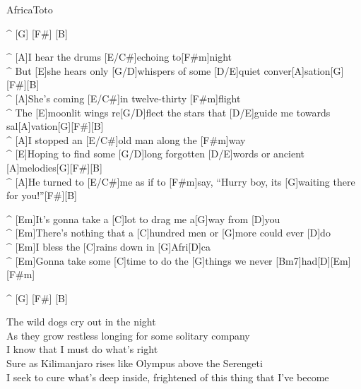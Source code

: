 \begin{song}{Africa}{Toto}

\begin{guitar}
^ [G] [F#] [B]\\
\end{guitar}

\begin{guitar}
^ [A]I hear the drums [E/C#]echoing to[F#m]night\\
^ But [E]she hears only [G/D]whispers of some [D/E]quiet conver[A]sation[G][F#][B]\\
^ [A]She's coming [E/C#]in twelve-thirty [F#m]flight\\
^ The [E]moonlit wings re[G/D]flect the stars that [D/E]guide me towards sal[A]vation[G][F#][B]\\
^ [A]I stopped an [E/C#]old man along the [F#m]way\\
^ [E]Hoping to find some [G/D]long forgotten [D/E]words or ancient [A]melodies[G][F#][B]\\
^ [A]He turned to [E/C#]me as if to [F#m]say, “Hurry boy, its [G]waiting there for you!”[F#][B]\\
\end{guitar}

\begin{guitar}
^ [Em]It's gonna take a [C]lot to drag me a[G]way from [D]you\\
^ [Em]There's nothing that a [C]hundred men or [G]more could ever [D]do\\
^ [Em]I bless the [C]rains down in [G]Afri[D]ca\\
^ [Em]Gonna take some [C]time to do the [G]things we never [Bm7]had[D][Em][F#m]\\
\end{guitar}

\begin{guitar}
^ [G] [F#] [B]\\
\end{guitar}

\begin{guitar}
The wild dogs cry out in the night\\
As they grow restless longing for some solitary company\\
I know that I must do what's right\\
Sure as Kilimanjaro rises like Olympus above the Serengeti\\
I seek to cure what's deep inside, frightened of this thing that I've become\\
\end{guitar}


\end{song}
